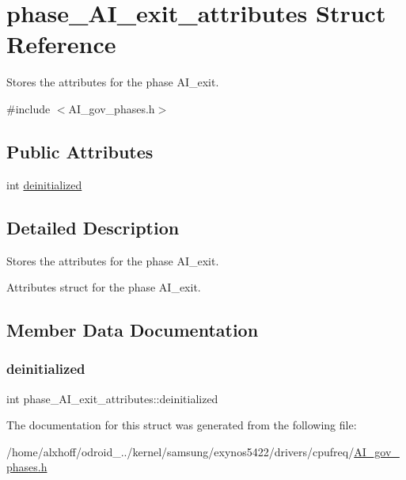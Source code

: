 \hypertarget{structphase__AI__exit__attributes}{}\section{phase\+\_\+\+A\+I\+\_\+exit\+\_\+attributes Struct Reference}
\label{structphase__AI__exit__attributes}


Stores the attributes for the phase A\+I\+\_\+exit.  




{\ttfamily \#include $<$A\+I\+\_\+gov\+\_\+phases.\+h$>$}

\subsection*{Public Attributes}
\begin{DoxyCompactItemize}
\item 
int \hyperlink{structphase__AI__exit__attributes_ae2237971902155129c78b414269a961d}{deinitialized}
\end{DoxyCompactItemize}


\subsection{Detailed Description}
Stores the attributes for the phase A\+I\+\_\+exit. 

Attributes struct for the phase A\+I\+\_\+exit. 

\subsection{Member Data Documentation}
\mbox{\label{structphase__AI__exit__attributes_ae2237971902155129c78b414269a961d}} 
\subsubsection{\texorpdfstring{deinitialized}{deinitialized}}
{\footnotesize\ttfamily int phase\+\_\+\+A\+I\+\_\+exit\+\_\+attributes\+::deinitialized}



The documentation for this struct was generated from the following file\+:\begin{DoxyCompactItemize}
\item 
/home/alxhoff/odroid\+\_../kernel/samsung/exynos5422/drivers/cpufreq/\hyperlink{AI__gov__phases_8h}{A\+I\+\_\+gov\+\_\+phases.\+h}\end{DoxyCompactItemize}
